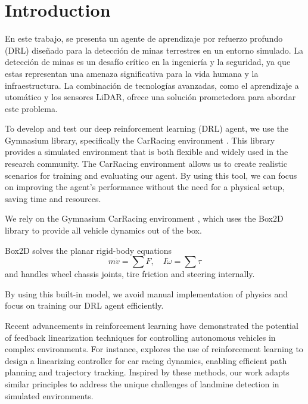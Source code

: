 \section{Introduction}
En este trabajo, se presenta un agente de aprendizaje por refuerzo 
profundo (DRL) diseñado para la detección de minas terrestres en un 
entorno simulado. La detección de minas es un desafío crítico en la 
ingeniería y la seguridad, ya que estas representan una amenaza 
significativa para la vida humana y la infraestructura. 
La combinación de tecnologías avanzadas, como el aprendizaje a
utomático y los sensores LiDAR, ofrece una solución prometedora 
para abordar este problema.

To develop and test our deep reinforcement learning (DRL) agent, we use the Gymnasium library, specifically the CarRacing environment \cite{gymnasium2023}. This library provides a simulated environment that is both flexible and widely used in the research community. The CarRacing environment allows us to create realistic scenarios for training and evaluating our agent. By using this tool, we can focus on improving the agent's performance without the need for a physical setup, saving time and resources.

We rely on the Gymnasium CarRacing environment \cite{gymnasium2023}, which uses the Box2D library to provide all vehicle dynamics out of the box.

Box2D solves the planar rigid-body equations  
\[
m\dot v = \sum F,\quad I\dot \omega = \sum \tau
\]  
and handles wheel chassis joints, tire friction and steering internally.

By using this built-in model, we avoid manual implementation of physics and focus on training our DRL agent efficiently.

Recent advancements in reinforcement learning have demonstrated the potential of feedback linearization techniques for controlling autonomous vehicles in complex environments. For instance, \cite{feedback_linearization2021} explores the use of reinforcement learning to design a linearizing controller for car racing dynamics, enabling efficient path planning and trajectory tracking. Inspired by these methods, our work adapts similar principles to address the unique challenges of landmine detection in simulated environments.




